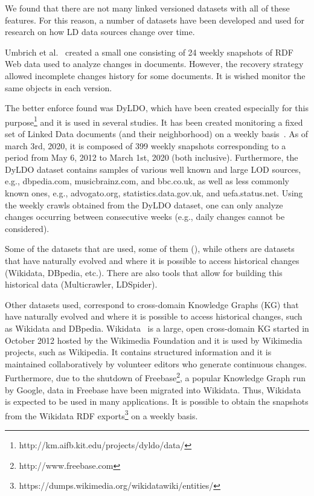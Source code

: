 \documentclass[sw]{iosart2x}
\begin{document}
We found that there are not many linked versioned datasets with all of these features. For this reason, a number of datasets have been developed and used for research on how LD data sources change over time. 

Umbrich et al.~\cite{UmbrichHHPD10} created a small one consisting of 24 weekly snapshots of RDF Web data used to analyze changes in documents. However, the recovery strategy allowed incomplete changes history for some documents. It is wished monitor the same objects in each version.

The better enforce found was DyLDO, which have been created especially for this purpose\footnote{http://km.aifb.kit.edu/projects/dyldo/data/} and it is used in several studies. It has been created monitoring a fixed set of Linked Data documents (and their neighborhood) on a weekly basis~\cite{KaferUHP12, KaferAUOH13}. As of march 3rd, 2020, it is composed of 399 weekly snapshots corresponding to a period from May 6, 2012 to March 1st, 2020 (both inclusive). Furthermore, the DyLDO dataset contains samples of various well known and large LOD sources, e.g., dbpedia.com, musicbrainz.com, and bbc.co.uk, as well as less commonly known ones, e.g., advogato.org, statistics.data.gov.uk, and uefa.status.net. Using the weekly crawls obtained from the DyLDO dataset, one can only analyze changes occurring between consecutive weeks (e.g., daily changes cannot be considered).

Some of the datasets that are used, some of them  (), while others are datasets that have naturally evolved and where it is possible to access historical changes (Wikidata, DBpedia, etc.). There are also tools that allow for building this historical data (Multicrawler, LDSpider).

Other datasets used, correspond to cross-domain Knowledge Graphs (KG) that have naturally evolved and where it is possible to access historical changes, such as Wikidata and DBpedia. Wikidata~\cite{VrandecicK14} is a large, open cross-domain KG started in October 2012 hosted by the Wikimedia Foundation and it is used by Wikimedia projects, such as Wikipedia. It contains structured information and it is maintained collaboratively by volunteer editors who generate continuous changes. Furthermore, due to the shutdown of Freebase\footnote{http://www.freebase.com}, a popular Knowledge Graph run by Google, data in Freebase have been migrated into Wikidata. Thus, Wikidata is expected to be used in many applications. It is possible to obtain the snapshots from the Wikidata RDF exports\footnote{https://dumps.wikimedia.org/wikidatawiki/entities/} on a weekly basis. 
\end{document}
